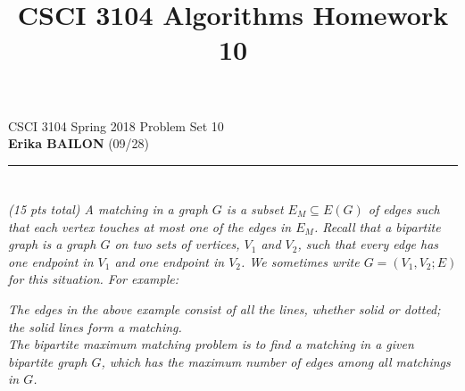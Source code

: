 \documentclass[12pt]{article} \setlength{\oddsidemargin}{0in}
\title{CSCI 3104 Algorithms Homework 10}
\begin{document}
\noindent CSCI 3104 Spring 2018 \hfill Problem Set 10\\
\textbf{Erika BAILON} (09/28)\\
\noindent\rule{\linewidth}{0.5pt}

\section{}
\textit{(15 pts total) A matching in a graph $G$ is a subset $E_M \subseteq E(G)$ of edges such that each vertex touches at most one of the edges in $E_M$. Recall that a bipartite graph is a graph $G$ on two sets of vertices, $V_1$ and $V_2$, such that every edge has one endpoint in $V_1$ and one endpoint in $V_2$. We sometimes write $G = (V_1, V_2; E)$ for this situation. For example:}

\begin{table}[H]
\centering
{}
\end{table}

\textit{The edges in the above example consist of all the lines, whether solid or dotted; the solid lines form a matching.\\
The bipartite maximum matching problem is to find a matching in a given bipartite graph $G$, which has the maximum number of edges among all matchings in $G$.}
\end{document}

